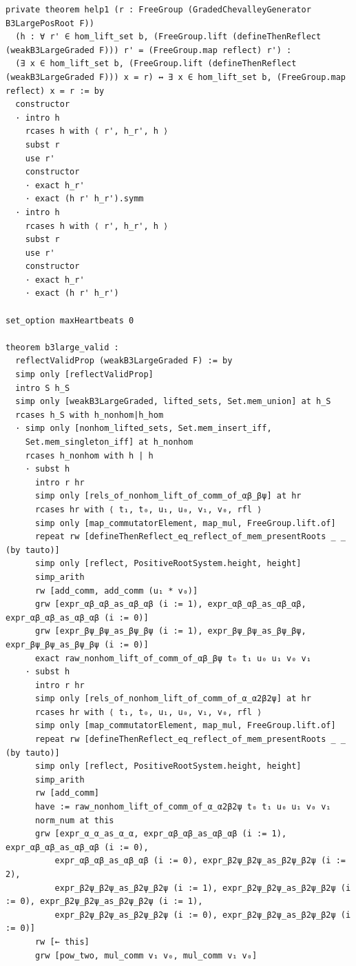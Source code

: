 \begin{Verbatim}
private theorem help1 (r : FreeGroup (GradedChevalleyGenerator B3LargePosRoot F))
  (h : ∀ r' ∈ hom_lift_set b, (FreeGroup.lift (defineThenReflect (weakB3LargeGraded F))) r' = (FreeGroup.map reflect) r') :
  (∃ x ∈ hom_lift_set b, (FreeGroup.lift (defineThenReflect (weakB3LargeGraded F))) x = r) ↔ ∃ x ∈ hom_lift_set b, (FreeGroup.map reflect) x = r := by
  constructor
  · intro h
    rcases h with ⟨ r', h_r', h ⟩
    subst r
    use r'
    constructor
    · exact h_r'
    · exact (h r' h_r').symm
  · intro h
    rcases h with ⟨ r', h_r', h ⟩
    subst r
    use r'
    constructor
    · exact h_r'
    · exact (h r' h_r')

set_option maxHeartbeats 0

theorem b3large_valid :
  reflectValidProp (weakB3LargeGraded F) := by
  simp only [reflectValidProp]
  intro S h_S
  simp only [weakB3LargeGraded, lifted_sets, Set.mem_union] at h_S
  rcases h_S with h_nonhom|h_hom
  · simp only [nonhom_lifted_sets, Set.mem_insert_iff,
    Set.mem_singleton_iff] at h_nonhom
    rcases h_nonhom with h | h
    · subst h
      intro r hr
      simp only [rels_of_nonhom_lift_of_comm_of_αβ_βψ] at hr
      rcases hr with ⟨ t₁, t₀, u₁, u₀, v₁, v₀, rfl ⟩
      simp only [map_commutatorElement, map_mul, FreeGroup.lift.of]
      repeat rw [defineThenReflect_eq_reflect_of_mem_presentRoots _ _ (by tauto)]
      simp only [reflect, PositiveRootSystem.height, height]
      simp_arith
      rw [add_comm, add_comm (u₁ * v₀)]
      grw [expr_αβ_αβ_as_αβ_αβ (i := 1), expr_αβ_αβ_as_αβ_αβ, expr_αβ_αβ_as_αβ_αβ (i := 0)]
      grw [expr_βψ_βψ_as_βψ_βψ (i := 1), expr_βψ_βψ_as_βψ_βψ, expr_βψ_βψ_as_βψ_βψ (i := 0)]
      exact raw_nonhom_lift_of_comm_of_αβ_βψ t₀ t₁ u₀ u₁ v₀ v₁
    · subst h
      intro r hr
      simp only [rels_of_nonhom_lift_of_comm_of_α_α2β2ψ] at hr
      rcases hr with ⟨ t₁, t₀, u₁, u₀, v₁, v₀, rfl ⟩
      simp only [map_commutatorElement, map_mul, FreeGroup.lift.of]
      repeat rw [defineThenReflect_eq_reflect_of_mem_presentRoots _ _ (by tauto)]
      simp only [reflect, PositiveRootSystem.height, height]
      simp_arith
      rw [add_comm]
      have := raw_nonhom_lift_of_comm_of_α_α2β2ψ t₀ t₁ u₀ u₁ v₀ v₁
      norm_num at this
      grw [expr_α_α_as_α_α, expr_αβ_αβ_as_αβ_αβ (i := 1), expr_αβ_αβ_as_αβ_αβ (i := 0),
          expr_αβ_αβ_as_αβ_αβ (i := 0), expr_β2ψ_β2ψ_as_β2ψ_β2ψ (i := 2),
          expr_β2ψ_β2ψ_as_β2ψ_β2ψ (i := 1), expr_β2ψ_β2ψ_as_β2ψ_β2ψ (i := 0), expr_β2ψ_β2ψ_as_β2ψ_β2ψ (i := 1),
          expr_β2ψ_β2ψ_as_β2ψ_β2ψ (i := 0), expr_β2ψ_β2ψ_as_β2ψ_β2ψ (i := 0)]
      rw [← this]
      grw [pow_two, mul_comm v₁ v₀, mul_comm v₁ v₀]

\end{Verbatim}
